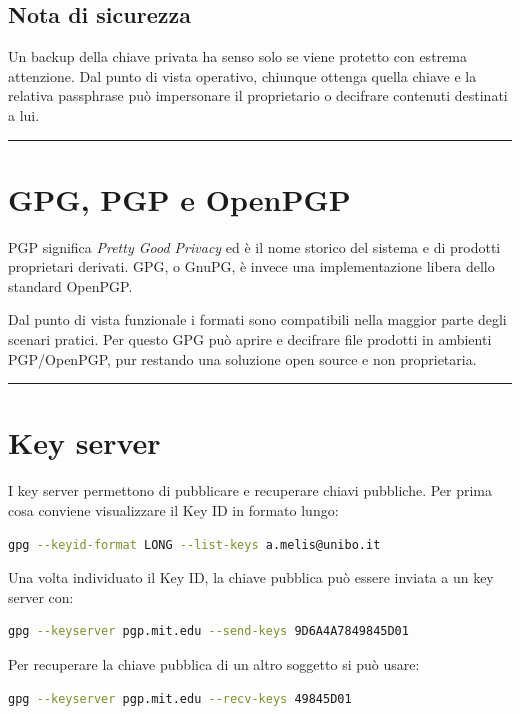 \documentclass[12pt, a4paper]{report}
\begin{document}
\subsection{Nota di sicurezza}
Un backup della chiave privata ha senso solo se viene protetto con estrema attenzione. Dal punto di vista operativo, chiunque ottenga quella chiave e la relativa passphrase può impersonare il proprietario o decifrare contenuti destinati a lui.

\noindent\rule{\textwidth}{0.4pt}

\section{GPG, PGP e OpenPGP}

PGP significa \textit{Pretty Good Privacy} ed è il nome storico del sistema e di prodotti proprietari derivati. GPG, o GnuPG, è invece una implementazione libera dello standard OpenPGP.

Dal punto di vista funzionale i formati sono compatibili nella maggior parte degli scenari pratici. Per questo GPG può aprire e decifrare file prodotti in ambienti PGP/OpenPGP, pur restando una soluzione open source e non proprietaria.

\noindent\rule{\textwidth}{0.4pt}

\section{Key server}

I key server permettono di pubblicare e recuperare chiavi pubbliche. Per prima cosa conviene visualizzare il Key ID in formato lungo:

\begin{lstlisting}[language=bash]
	gpg --keyid-format LONG --list-keys a.melis@unibo.it
\end{lstlisting}

Una volta individuato il Key ID, la chiave pubblica può essere inviata a un key server con:

\begin{lstlisting}[language=bash]
	gpg --keyserver pgp.mit.edu --send-keys 9D6A4A7849845D01
\end{lstlisting}

Per recuperare la chiave pubblica di un altro soggetto si può usare:

\begin{lstlisting}[language=bash]
	gpg --keyserver pgp.mit.edu --recv-keys 49845D01
\end{lstlisting}
\end{document}
